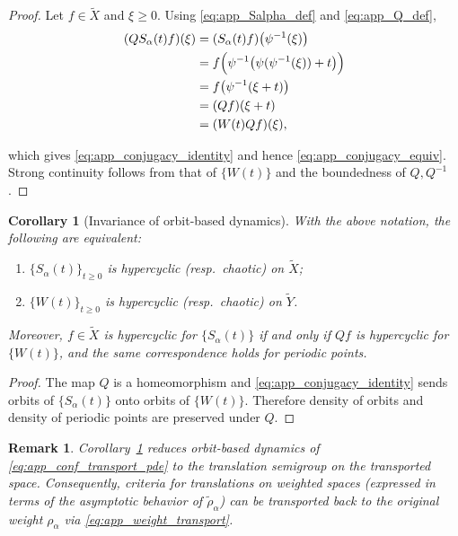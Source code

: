 \documentclass[preprint,12pt]{elsarticle}
\newtheorem{corollary}{Corollary}
\newtheorem{remark}{Remark}
\newtheorem{proof}{Proof}
\begin{document}
\begin{proof} Let $f\in\widetilde X$ and $\xi\ge0$. Using \eqref{eq:app_Salpha_def} and \eqref{eq:app_Q_def},
\begin{align*}
(QS_\alpha(t)f)(\xi)&=(S_\alpha(t)f)\bigl(\psi^{-1}(\xi)\bigr)\\
&=f\Bigl(\psi^{-1}\bigl(\psi(\psi^{-1}(\xi))+t\bigr)\Bigr)\\
&=f\bigl(\psi^{-1}(\xi+t)\bigr)\\
&=(Qf)(\xi+t)\\
&=(W(t)Qf)(\xi),
\end{align*}

which gives \eqref{eq:app_conjugacy_identity} and hence \eqref{eq:app_conjugacy_equiv}. Strong continuity follows from that of $\{W(t)\}$ and the boundedness of $Q,Q^{-1}$.
\end{proof}

\begin{corollary}[Invariance of orbit-based dynamics]\label{cor:app_dynamics_invariance}
With the above notation, the following are equivalent:
\begin{enumerate}
\item $\{S_\alpha(t)\}_{t\ge0}$ is hypercyclic (resp.\ chaotic) on $\widetilde X$;
\item $\{W(t)\}_{t\ge0}$ is hypercyclic (resp.\ chaotic) on $\widetilde Y$.
\end{enumerate}
Moreover, $f\in\widetilde X$ is hypercyclic for $\{S_\alpha(t)\}$ if and only if
$Qf$ is hypercyclic for $\{W(t)\}$, and the same correspondence holds for periodic points.
\end{corollary}

\begin{proof}
The map $Q$ is a homeomorphism and \eqref{eq:app_conjugacy_identity} sends orbits of $\{S_\alpha(t)\}$
onto orbits of $\{W(t)\}$.
Therefore density of orbits and density of periodic points are preserved under $Q$.
\end{proof}

\begin{remark}
Corollary~\ref{cor:app_dynamics_invariance} reduces orbit-based dynamics of
\eqref{eq:app_conf_transport_pde} to the translation semigroup on the transported space.
Consequently, criteria for translations on weighted spaces (expressed in terms of the
asymptotic behavior of $\widetilde\rho_\alpha$) can be transported back to the original weight
$\rho_\alpha$ via \eqref{eq:app_weight_transport}.
\end{remark}
\end{document}
